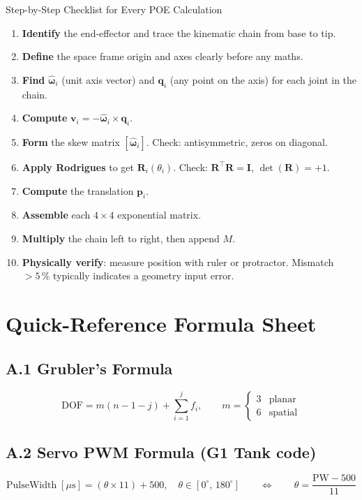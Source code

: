 \documentclass[12pt,a4paper]{article}
\newcommand{\vect}[1]{\bm{#1}}
\newcommand{\mat}[1]{\mathbf{#1}}
\begin{document}
\begin{donebox}{Step-by-Step Checklist for Every POE Calculation}
\begin{enumerate}[leftmargin=1.5em,itemsep=2pt]
  \item \textbf{Identify} the end-effector and trace the kinematic chain from base to tip.
  \item \textbf{Define} the space frame origin and axes clearly before any maths.
  \item \textbf{Find} $\vect{\hat\omega}_i$ (unit axis vector) and $\vect{q}_i$
        (any point on the axis) for each joint in the chain.
  \item \textbf{Compute} $\vect{v}_i = -\vect{\hat\omega}_i \times \vect{q}_i$.
  \item \textbf{Form} the skew matrix $[\vect{\hat\omega}_i]$.
        Check: antisymmetric, zeros on diagonal.
  \item \textbf{Apply Rodrigues} to get $\mat{R}_i(\theta_i)$.
        Check: $\mat{R}^\top\mat{R}=\mat{I}$, $\det(\mat{R})=+1$.
  \item \textbf{Compute} the translation $\vect{p}_i$.
  \item \textbf{Assemble} each $4\times4$ exponential matrix.
  \item \textbf{Multiply} the chain left to right, then append $M$.
  \item \textbf{Physically verify}: measure position with ruler or protractor.
        Mismatch $>5\,\%$ typically indicates a geometry input error.
\end{enumerate}
\end{donebox}

\newpage
\section{Quick-Reference Formula Sheet}

\subsection*{A.1 \quad Grubler's Formula}
\[
  \mathrm{DOF} = m(n - 1 - j) + \sum_{i=1}^{j} f_i,
  \qquad
  m = \begin{cases}3 & \text{planar}\\6 & \text{spatial}\end{cases}
\]

\subsection*{A.2 \quad Servo PWM Formula (G1 Tank code)}
\[
  \text{PulseWidth}\;[\mu\text{s}] = (\theta \times 11) + 500,
  \quad \theta \in [0^\circ,\,180^\circ]
  \qquad\Leftrightarrow\qquad
  \theta = \frac{\text{PW} - 500}{11}
\]
\end{document}
